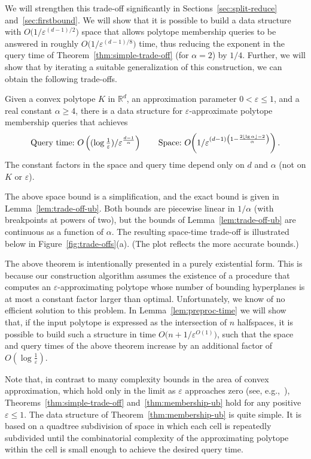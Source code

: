 \documentclass[11pt]{article}   \usepackage[letterpaper,hmargin=2.1cm,vmargin=3cm]{geometry}
\newcommand{\floor}[1]{\left\lfloor #1\right\rfloor}
\newcommand{\RE}{\mathbb{R}}    \newcommand{\ZZ}{\mathbb{Z}}    \newcommand{\eps}{\varepsilon}  \newcommand{\ST}{\,:\,}         \newcommand{\sq}{\square}
\newcommand{\OO}[1]{O\kern-2pt\left(#1\right)}  \newcommand{\half}[1]{\frac{#1}{2}}
\newcommand{\inv}[1]{\frac{1}{#1}}
\begin{document}
We will strengthen this trade-off significantly in Sections~\ref{sec:split-reduce} and~\ref{sec:firstbound}. We will show that it is possible to build a data structure with $O\big(1/\eps^{(d-1)/2}\big)$ space that allows polytope membership queries to be answered in roughly $O\big(1/\eps^{(d-1)/8}\big)$ time, thus reducing the exponent in the query time of Theorem~\ref{thm:simple-trade-off} (for $\alpha=2$) by $1/4$. Further, we will show that by iterating a suitable generalization of this construction, we can obtain the following trade-offs.

\begin{theorem} \label{thm:membership-ub}
Given a convex polytope $K$ in $\RE^d$, an approximation parameter $0 < \eps \le 1$, and a real constant $\alpha \geq 4$, there is a data structure for  $\eps$-approximate polytope membership queries that achieves
\[
\hbox{Query time:~} O\left(({\textstyle \log \inv{\eps}})/\eps^{\frac{d-1}{\alpha}}\right)
\qquad
\textrm{Space:~} \OO{1/\eps^{(d-1)\left(1 - \frac{2\floor{\lg \alpha} - 2}{\alpha} \right)}}.
\]
The constant factors in the space and query time depend only on $d$ and $\alpha$ (not on $K$ or $\eps$).
\end{theorem}


The above space bound is a simplification, and the exact bound is given in Lemma~\ref{lem:trade-off-ub}. Both bounds are piecewise linear in $1/\alpha$ (with breakpoints at powers of two), but the bounds of Lemma~\ref{lem:trade-off-ub} are continuous as a function of $\alpha$. The resulting space-time trade-off is illustrated below in Figure~\ref{fig:trade-offs}(a). (The plot reflects the more accurate bounds.) 

The above theorem is intentionally presented in a purely existential form. This is because our construction algorithm assumes the existence of a procedure that computes an $\eps$-approximating polytope whose number of bounding hyperplanes is at most a constant factor larger than optimal. Unfortunately, we know of no efficient solution to this problem. In Lemma~\ref{lem:preproc-time} we will show that, if the input polytope is expressed as the intersection of $n$ halfspaces, it is possible to build such a structure in time $O\big(n + 1/\eps^{O(1)}\big)$, such that the space and query times of the above theorem increase by an additional factor of $O(\log \inv{\eps})$.

Note that, in contrast to many complexity bounds in the area of convex approximation, which hold only in the limit as $\eps$ approaches zero (see, e.g.,~\cite{Gru93,Bor00}), Theorems~\ref{thm:simple-trade-off} and~\ref{thm:membership-ub} hold for any positive $\eps \le 1$. The data structure of Theorem~\ref{thm:membership-ub} is quite simple. It is based on a quadtree subdivision of space in which each cell is repeatedly subdivided until the combinatorial complexity of the approximating polytope within the cell is small enough to achieve the desired query time. 
\end{document}
